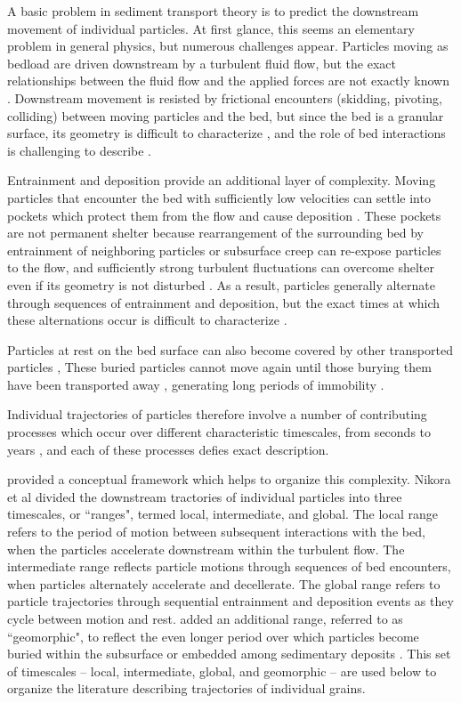 A basic problem in sediment transport theory is to predict the downstream movement of individual particles.
At first glance, this seems an elementary problem in general physics, but numerous challenges appear.
Particles moving as bedload are driven downstream by a turbulent fluid flow, but the exact relationships between the fluid flow and the applied forces are not exactly known \citep{Maxey1983,Schmeeckle2007}.
Downstream movement is resisted by frictional encounters (skidding, pivoting, colliding) between moving particles and the bed, but since the bed is a granular surface, its geometry is difficult to characterize \citep{Gordon1972}, and the role of bed interactions is challenging to describe \citep{Sekine1992, Nino1998}.

Entrainment and deposition provide an additional layer of complexity.
Moving particles that encounter the bed with sufficiently low velocities can settle into pockets which protect them from the flow \citep{Miller1966} and cause deposition \citep{Charru2004}.
These pockets are not permanent shelter because rearrangement of the surrounding bed by entrainment of neighboring particles or subsurface creep \citep{Houssais2016,Frey2014} can re-expose particles to the flow, and sufficiently strong turbulent fluctuations \citep{Cameron2020} can overcome shelter even if its geometry is not disturbed \citep{Valyrakis2010,Celik2014}. 
As a result, particles generally alternate through sequences of entrainment and deposition, but the exact times at which these alternations occur is difficult to characterize \citep{Einstein1937}.

Particles at rest on the bed surface can also become covered by other transported particles \citep{Yang1971}, 
These buried particles cannot move again until those burying them have been transported away \citep{Nakagawa1981}, generating long periods of immobility \citep{Hassan1994,Ferguson2002}.

Individual trajectories of particles therefore involve a number of contributing processes which occur over different characteristic timescales, from seconds to years \citep{Pretzlav2021}, and each of these processes defies exact description.

\citet{Nikora2001,Nikora2002} provided a conceptual framework which helps to organize this complexity.
Nikora et al divided the downstream tractories of individual particles into three timescales, or ``ranges", termed local, intermediate, and global.
The local range refers to the period of motion between subsequent interactions with the bed, when the particles accelerate downstream within the turbulent flow.
The intermediate range reflects particle motions through sequences of bed encounters, when particles alternately accelerate and decellerate. 
The global range refers to particle trajectories through sequential entrainment and deposition events as they cycle between motion and rest.
\citet{Hassan2017} added an additional range, referred to as ``geomorphic", to reflect the even longer period over which particles become buried within the subsurface or embedded among sedimentary deposits \citep{Bradley2017}.
This set of timescales -- local, intermediate, global, and geomorphic -- are used below to organize the literature describing trajectories of individual grains.

